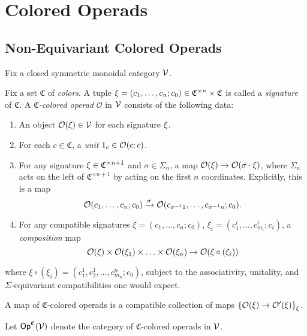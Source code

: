 \documentclass[a4paper,10pt
]{article}%
\renewcommand{\1}{\ensuremath{\mathbb{id}}}
\begin{document}
\section{Colored Operads}


\subsection{Non-Equivariant Colored Operads}

Fix a closed symmetric monoidal category $\mathcal V$.

\begin{definition}
      Fix a set $\mathfrak C$ of \textit{colors}.
      A tuple
      $\xi = (c_1, \ldots, c_n; c_0) \in \mathfrak C^{\times n} \times \mathfrak C$
      is called a \textit{signature} of $\mathfrak C$.
      A \textit{$\mathfrak C$-colored operad} $\mathcal{O}$ in $\mathcal V$ consists of the following data:
      \begin{enumerate}[label = (\arabic*)]
      \item An object $\mathcal{O}(\xi) \in \mathcal V$ for each signature $\xi$.
      \item For each $c \in \mathfrak C$, a \textit{unit} $1_c \in \mathcal{O}(c;c)$.
      \item For any signature $\xi \in \mathfrak C^{\times n+1}$ and $\sigma \in \Sigma_n$, a map $\mathcal{O}(\xi) \to \mathcal{O}(\sigma \cdot \xi)$,
            where $\Sigma_n$ acts on the left of $\mathfrak C^{\times n+1}$ by acting on the first $n$ coordinates.
            Explicitly, this is a map
            \begin{equation}
                  \mathcal{O}(c_1, \ldots, c_n; c_0) \xrightarrow{\sigma} \mathcal{O}(c_{\sigma^{-1}1}, \ldots, c_{\sigma^{-1}n}; c_0).
            \end{equation}
      \item For any compatible signatures $\xi = (c_1, \ldots, c_n; c_0)$, $\xi_i = (c_{1}^i, \ldots, c_{m_i}^i; c_i)$, a \textit{composition} map
            \begin{equation}
                  \mathcal{O}(\xi) \times \mathcal{O}(\xi_1) \times \ldots \times \mathcal{O}(\xi_n) \to \mathcal{O}(\xi \circ (\xi_i))
            \end{equation}
      \end{enumerate}
      where $\xi \circ (\xi_i) = (c_1^1,c_2^1,\dots,c_{m_n}^{n}; c_0)$,
      subject to the associativity, unitality, and $\Sigma$-equivariant compatibilities one would expect.      
      
      A map of $\mathfrak C$-colored operads is a compatible collection of maps
      $\left\{\mathcal{O}(\xi) \to \mathcal{O}'(\xi)\right\}_{\xi}$.
      
      Let $\mathsf{Op}^{\mathfrak C}(\mathcal V)$ denote the category of $\mathfrak C$-colored operads in $\mathcal V$.
\end{definition}
\end{document}
